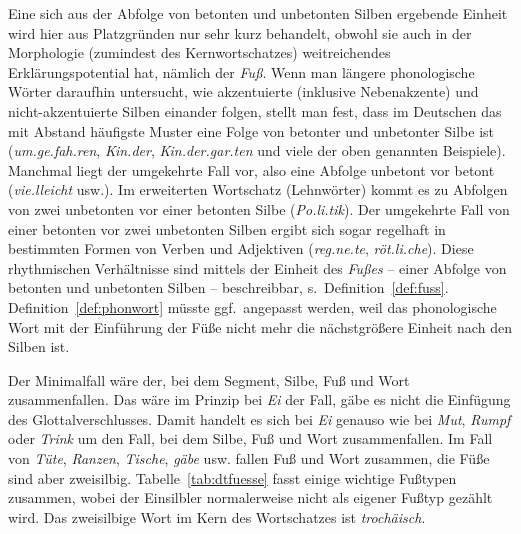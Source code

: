 Eine sich aus der Abfolge von betonten und unbetonten Silben ergebende Einheit wird hier aus Platzgründen nur sehr kurz behandelt, obwohl sie auch in der Morphologie (zumindest des Kernwortschatzes) weitreichendes Erklärungspotential hat, nämlich der \textit{Fuß}.
Wenn man längere phonologische Wörter daraufhin untersucht, wie akzentuierte (inklusive Nebenakzente) und nicht-akzentuierte Silben einander folgen, stellt man fest, dass im Deutschen das mit Abstand häufigste Muster eine Folge von betonter und unbetonter Silbe ist (\textit{\Akz um.ge.\Nakz fah.ren}, \textit{\Akz Kin.der}, \textit{\Akz Kin.der.\Nakz gar.ten} und viele der oben genannten Beispiele).
Manchmal liegt der umgekehrte Fall vor, also eine Abfolge unbetont vor betont (\textit{vie.\Akz lleicht} usw.).
Im erweiterten Wortschatz (\idR Lehnwörter) kommt es zu Abfolgen von zwei unbetonten vor einer betonten Silbe (\textit{Po.li.\Akz tik}).
Der umgekehrte Fall von einer betonten vor zwei unbetonten Silben ergibt sich sogar regelhaft in bestimmten Formen von Verben und Adjektiven (\textit{\Akz reg.ne.te}, \textit{\Akz röt.li.che}).
Diese rhythmischen Verhältnisse sind mittels der Einheit des \textit{Fußes} -- einer Abfolge von betonten und unbetonten Silben -- beschreibbar, s.\ Definition~\ref{def:fuss}.
Definition~\ref{def:phonwort} müsste ggf.\ angepasst werden, weil das phonologische Wort mit der Einführung der Füße nicht mehr die nächstgrößere Einheit nach den Silben ist.


{}


Der Minimalfall wäre der, bei dem Segment, Silbe, Fuß und Wort zusammenfallen.
Das wäre im Prinzip bei \textit{Ei} der Fall, gäbe es nicht die Einfügung des Glottalverschlusses.
Damit handelt es sich bei \textit{Ei} genauso wie bei \textit{Mut}, \textit{Rumpf} oder \textit{Trink} um den Fall, bei dem Silbe, Fuß und Wort zusammenfallen.
Im Fall von \textit{\Akz Tüte}, \textit{\Akz Ranzen}, \textit{\Akz Tische}, \textit{\Akz gäbe} usw. fallen Fuß und Wort zusammen, die Füße sind aber zweisilbig.
Tabelle~\ref{tab:dtfuesse} fasst einige wichtige Fußtypen zusammen, wobei der Einsilbler normalerweise nicht als eigener Fußtyp gezählt wird.
Das zweisilbige Wort im Kern des Wortschatzes ist \textit{trochäisch}.

